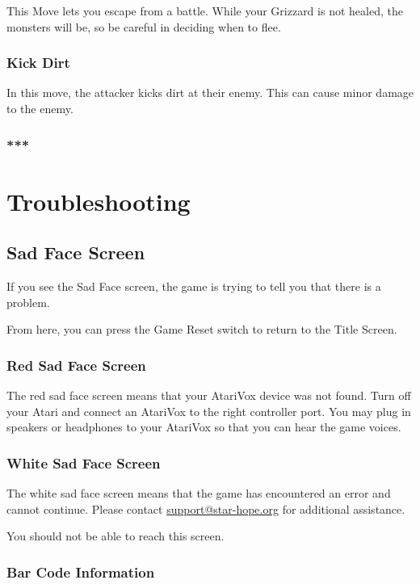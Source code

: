 \documentclass[12pt,twoside,openright,book]{memoir}
\begin{document}
\begin{description}
This Move  lets you  escape from  a battle. While  your Grizzard  is not
healed, the monsters will be, so be careful in deciding when to flee.

\subsection{Kick Dirt}

In this  move, the attacker  kicks dirt at  their enemy. This  can cause
minor damage to the enemy.

\subsection{***}

\chapter{Troubleshooting}

\section{Sad Face Screen}

If you  see the Sad  Face screen,  the game is  trying to tell  you that
there is a problem.

From  here,  you can  press  the  Game Reset  switch  to  return to  the
Title Screen.

\subsection{Red Sad Face Screen}

The red sad  face screen means that your AtariVox  device was not found. 
Turn off your Atari and connect an AtariVox to the right controller port. 
You may plug in speakers or headphones to your AtariVox so that you can hear
the game voices.

\subsection{White Sad Face Screen}

The white sad  face screen means that the game  has encountered an error
and cannot continue. Please contact
\href{mailto:support@star-hope.org}{support@star-hope.org} for 
additional assistance.

You should not be able to reach this screen.

\subsection{Bar Code Information}


\end{description}
\end{document}
